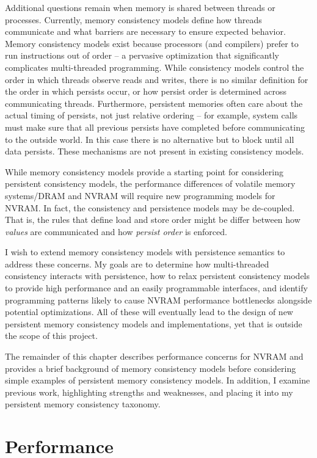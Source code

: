 Additional questions remain when memory is shared between threads or processes.
Currently, memory consistency models define how threads communicate and what barriers are necessary to ensure expected behavior.
Memory consistency models exist because processors (and compilers) prefer to run instructions out of order -- a pervasive optimization that significantly complicates multi-threaded programming.
While consistency models control the order in which threads observe reads and writes, there is no similar definition for the order in which persists occur, or how persist order is determined across communicating threads.
Furthermore, persistent memories often care about the actual timing of persists, not just relative ordering -- for example, system calls must make sure that all previous persists have completed before communicating to the outside world.
In this case there is no alternative but to block until all data persists.
These mechanisms are not present in existing consistency models.

While memory consistency models provide a starting point for considering persistent consistency models, the performance differences of volatile memory systems/DRAM and NVRAM will require new programming models for NVRAM.
In fact, the consistency and persistence models may be de-coupled.
That is, the rules that define load and store order might be differ between how \emph{values} are communicated and how \emph{persist order} is enforced.

I wish to extend memory consistency models with persistence semantics to address these concerns.
My goals are to determine how multi-threaded consistency interacts with persistence, how to relax persistent consistency models to provide high performance and an easily programmable interfaces, and identify programming patterns likely to cause NVRAM performance bottlenecks alongside potential optimizations.
All of these will eventually lead to the design of new persistent memory consistency models and implementations, yet that is outside the scope of this project.

The remainder of this chapter describes performance concerns for NVRAM and provides a brief background of memory consistency models before considering simple examples of persistent memory consistency models.
In addition, I examine previous work, highlighting strengths and weaknesses, and placing it into my persistent memory consistency taxonomy.

\section{Performance}
\label{sec:PMC:Performance}

